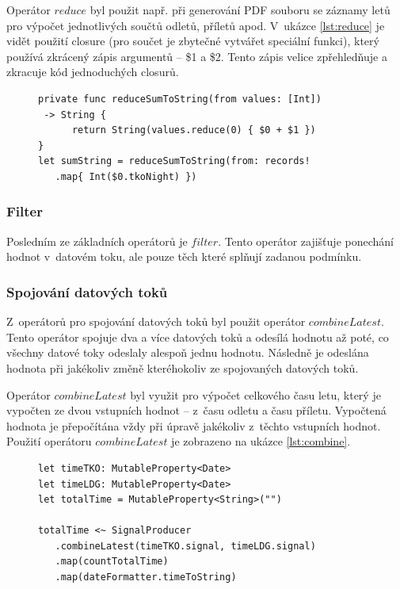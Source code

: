 \documentclass[thesis=M,czech]{FITthesis}[2012/06/26]
\begin{document}
Operátor $reduce$ byl použit např. při generování PDF souboru se záznamy letů pro výpočet jednotlivých součtů odletů, příletů apod. V~ukázce \ref{lst:reduce} je vidět použití closure (pro součet je zbytečné vytvářet speciální funkci), který používá zkrácený zápis argumentů -- \$1 a \$2. Tento zápis velice zpřehledňuje a zkracuje kód jednoduchých closurů.

\begin{figure}
\begin{minipage}{\linewidth}
\begin{lstlisting}[caption={Ukázka použití Reduce},label={lst:reduce}]
private func reduceSumToString(from values: [Int])
 -> String {
      return String(values.reduce(0) { $0 + $1 })
}
let sumString = reduceSumToString(from: records!
   .map{ Int($0.tkoNight) })
\end{lstlisting}
\end{minipage}
\end{figure}

\subsubsection{Filter}
Posledním ze základních operátorů je $filter$. Tento operátor zajišťuje ponechání hodnot v~datovém toku, ale pouze těch které splňují zadanou podmínku.\cite{operators}

\subsubsection{Spojování datových toků}
Z~operátorů pro spojování datových toků byl použit operátor $combineLatest$. Tento operátor spojuje dva a více datových toků a odesílá hodnotu až poté, co všechny datové toky odeslaly alespoň jednu hodnotu. Následně je odeslána hodnota při jakékoliv změně kteréhokoliv ze spojovaných datových toků. \cite{operators}

Operátor $combineLatest$ byl využit pro výpočet celkového času letu, který je vypočten ze dvou vstupních hodnot -- z~času odletu a času příletu. Vypočtená hodnota je přepočítána vždy při úpravě jakékoliv z~těchto vstupních hodnot. Použití operátoru $combineLatest$ je zobrazeno na ukázce \ref{lst:combine}.

\begin{figure}
\begin{minipage}{\linewidth}
\begin{lstlisting}[caption={Ukázka použití spojení dvou datových toků},label={lst:combine}]
let timeTKO: MutableProperty<Date>
let timeLDG: MutableProperty<Date>
let totalTime = MutableProperty<String>("")

totalTime <~ SignalProducer
   .combineLatest(timeTKO.signal, timeLDG.signal)
   .map(countTotalTime)
   .map(dateFormatter.timeToString)
\end{lstlisting}
\end{minipage}
\end{figure}
\end{document}
